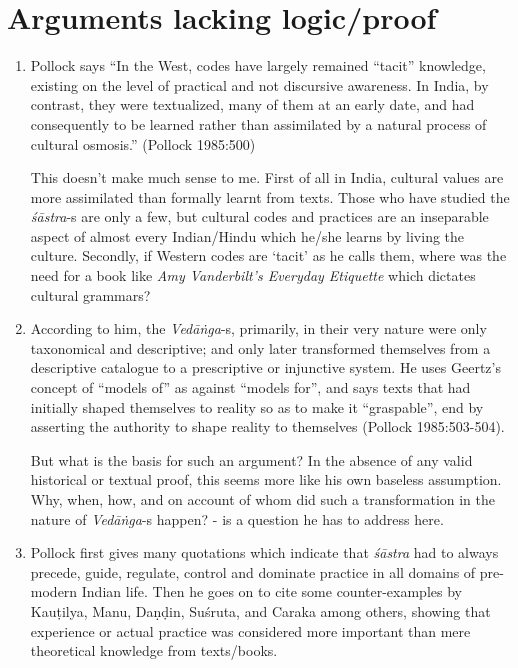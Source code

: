 \section*{Arguments lacking logic/proof}

\begin{enumerate}
\item Pollock says ``In the West, codes have largely remained ``tacit'' knowledge, existing on the level of practical and not discursive awareness. In India, by contrast, they were textualized, many of them at an early date, and had consequently to be learned rather than assimilated by a natural process of cultural osmosis.''  (Pollock 1985:500) 

This doesn't make much sense to me. First of all in India, cultural values are more assimilated than formally learnt from texts. Those who have studied the {\it śāstra}-s are only a few, but cultural codes and practices are an inseparable aspect of almost every Indian/Hindu which he/she learns by living the culture.  Secondly, if Western codes are `tacit' as he calls them, where was the need for a book like \textsl{Amy Vanderbilt's Everyday Etiquette}  which dictates cultural grammars?

\item According to him, the {\it Vedāṅga}-s,  primarily, in their very nature were only taxonomical and descriptive; and only later transformed themselves from a descriptive catalogue to a prescriptive or injunctive system. He uses Geertz's concept of ``models of'' as against ``models for'', and says texts that had initially shaped themselves to reality so as to make it ``graspable'', end by asserting the authority to shape reality to themselves (Pollock 1985:503-504). 

But what is the basis for such an argument? In the absence of any valid historical or textual proof, this seems more like his own baseless assumption. Why, when, how, and on account of whom did such a transformation in the nature of {\it Vedāṅga}-s happen? - is a question he has to address here.

\item Pollock first gives many quotations which indicate that {\it śāstra} had to always precede, guide, regulate, control and dominate practice in all domains of pre-modern Indian life. Then he goes on to cite some counter-examples by Kauṭilya, Manu, Daṇḍin, Suśruta, and Caraka among others, showing that experience or actual practice was considered more important than mere theoretical knowledge from texts/books. 


\end{enumerate}
